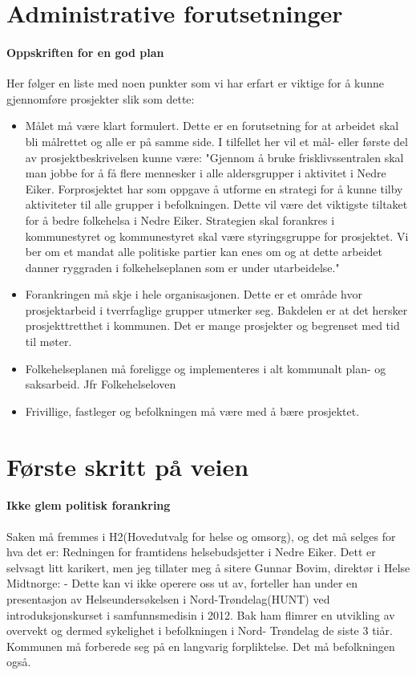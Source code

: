 \documentclass[12pt]{memoir} %
\begin{document}
	\section{Administrative forutsetninger}
		\paragraph{Oppskriften for en god plan\\}
			Her følger en liste med noen punkter som vi har erfart er viktige for å kunne gjennomføre prosjekter slik som dette:
				\begin{itemize}
					\item Målet må være klart formulert. Dette er en forutsetning for at arbeidet skal bli målrettet og alle er på samme side. I tilfellet her vil et mål- eller første del av prosjektbeskrivelsen kunne være: "Gjennom å bruke frisklivssentralen skal man jobbe for å få flere mennesker i alle aldersgrupper i aktivitet i Nedre Eiker. Forprosjektet har som oppgave å utforme en strategi for å kunne tilby aktiviteter til alle grupper i befolkningen. Dette vil være det viktigste tiltaket for å bedre folkehelsa i Nedre Eiker. Strategien skal forankres i kommunestyret og kommunestyret skal være styringsgruppe for prosjektet. Vi ber om et mandat alle politiske partier kan enes om og at dette arbeidet danner ryggraden i folkehelseplanen som er under utarbeidelse."\\
					\item Forankringen må skje i hele organisasjonen. Dette er et område hvor prosjektarbeid i tverrfaglige grupper utmerker seg. Bakdelen er at det hersker prosjekttretthet i kommunen. Det er mange prosjekter og begrenset med tid til møter.\\
					\item Folkehelseplanen må foreligge og implementeres i alt kommunalt plan- og saksarbeid. Jfr Folkehelseloven\cite{Folkehelseloven}\\
					\item Frivillige, fastleger og befolkningen må være med å bære prosjektet.\\
				\end{itemize}
	\section{Første skritt på veien}
		\paragraph{Ikke glem politisk forankring\\}
			Saken må fremmes i H2(Hovedutvalg for helse og omsorg), og det må selges for hva det er: Redningen for framtidens helsebudsjetter i Nedre Eiker. Dett er selvsagt litt karikert, men jeg tillater meg å sitere Gunnar Bovim, direktør i Helse Midtnorge: - Dette kan vi ikke operere oss ut av, forteller han under en presentasjon av Helseundersøkelsen i Nord-Trøndelag(HUNT) ved introduksjonskurset i samfunnsmedisin i 2012. Bak ham flimrer en utvikling av overvekt og dermed sykelighet i befolkningen i Nord- Trøndelag de siste 3 tiår. Kommunen må forberede seg på en langvarig forpliktelse. Det må befolkningen også.
\end{document}
